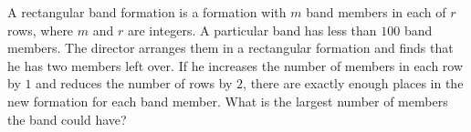 A rectangular band formation is a formation with $m$ band members in each of $r$ rows, where $m$ and $r$ are integers. A particular band has less than $100$ band members. The director arranges them in a rectangular formation and finds that he has two members left over. If he increases the number of members in each row by $1$ and reduces the number of rows by $2$, there are exactly enough places in the new formation for each band member. What is the largest number of members the band could have?
